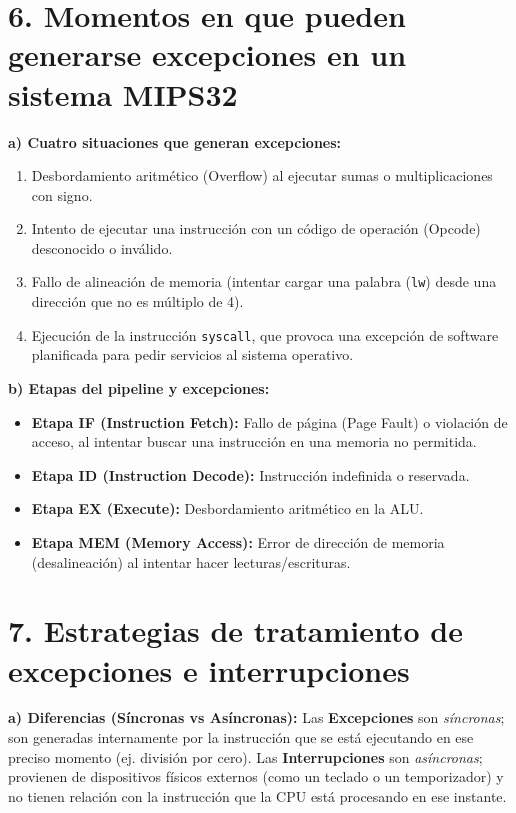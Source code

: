 \documentclass[12pt,a4paper]{article}
\begin{document}
\section*{6. Momentos en que pueden generarse excepciones en un sistema MIPS32}
\textbf{a) Cuatro situaciones que generan excepciones:}
\begin{enumerate}
    \item Desbordamiento aritmético (Overflow) al ejecutar sumas o multiplicaciones con signo.
    \item Intento de ejecutar una instrucción con un código de operación (Opcode) desconocido o inválido.
    \item Fallo de alineación de memoria (intentar cargar una palabra (\texttt{lw}) desde una dirección que no es múltiplo de 4).
    \item Ejecución de la instrucción \texttt{syscall}, que provoca una excepción de software planificada para pedir servicios al sistema operativo.
\end{enumerate}

\textbf{b) Etapas del pipeline y excepciones:}
\begin{itemize}
    \item \textbf{Etapa IF (Instruction Fetch):} Fallo de página (Page Fault) o violación de acceso, al intentar buscar una instrucción en una memoria no permitida.
    \item \textbf{Etapa ID (Instruction Decode):} Instrucción indefinida o reservada.
    \item \textbf{Etapa EX (Execute):} Desbordamiento aritmético en la ALU.
    \item \textbf{Etapa MEM (Memory Access):} Error de dirección de memoria (desalineación) al intentar hacer lecturas/escrituras.
\end{itemize}

\section*{7. Estrategias de tratamiento de excepciones e interrupciones}
\textbf{a) Diferencias (Síncronas vs Asíncronas):}
Las \textbf{Excepciones} son \textit{síncronas}; son generadas internamente por la instrucción que se está ejecutando en ese preciso momento (ej. división por cero). Las \textbf{Interrupciones} son \textit{asíncronas}; provienen de dispositivos físicos externos (como un teclado o un temporizador) y no tienen relación con la instrucción que la CPU está procesando en ese instante.
\end{document}
